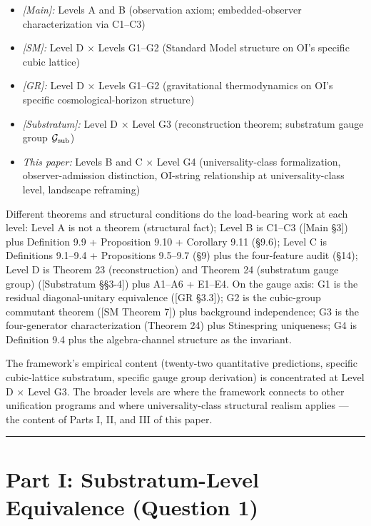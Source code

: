 \documentclass[
]{article}
\providecommand{\tightlist}{%
  \setlength{\itemsep}{0pt}\setlength{\parskip}{0pt}}
\begin{document}
\begin{itemize}
\tightlist
\item
  \emph{{[}Main{]}:} Levels A and B (observation axiom;
  embedded-observer characterization via C1--C3)
\item
  \emph{{[}SM{]}:} Level D × Levels G1--G2 (Standard Model structure on
  OI's specific cubic lattice)
\item
  \emph{{[}GR{]}:} Level D × Levels G1--G2 (gravitational thermodynamics
  on OI's specific cosmological-horizon structure)
\item
  \emph{{[}Substratum{]}:} Level D × Level G3 (reconstruction theorem;
  substratum gauge group \(\mathcal{G}_{\rm sub}\))
\item
  \emph{This paper:} Levels B and C × Level G4 (universality-class
  formalization, observer-admission distinction, OI-string relationship
  at universality-class level, landscape reframing)
\end{itemize}

Different theorems and structural conditions do the load-bearing work at
each level: Level A is not a theorem (structural fact); Level B is
C1--C3 ({[}Main §3{]}) plus Definition 9.9 + Proposition 9.10 +
Corollary 9.11 (§9.6); Level C is Definitions 9.1--9.4 + Propositions
9.5--9.7 (§9) plus the four-feature audit (§14); Level D is Theorem 23
(reconstruction) and Theorem 24 (substratum gauge group) ({[}Substratum
§§3-4{]}) plus A1--A6 + E1--E4. On the gauge axis: G1 is the residual
diagonal-unitary equivalence ({[}GR §3.3{]}); G2 is the cubic-group
commutant theorem ({[}SM Theorem 7{]}) plus background independence; G3
is the four-generator characterization (Theorem 24) plus Stinespring
uniqueness; G4 is Definition 9.4 plus the algebra-channel structure as
the invariant.

The framework's empirical content (twenty-two quantitative predictions,
specific cubic-lattice substratum, specific gauge group derivation) is
concentrated at Level D × Level G3. The broader levels are where the
framework connects to other unification programs and where
universality-class structural realism applies --- the content of Parts
I, II, and III of this paper.

\begin{center}\rule{0.5\linewidth}{0.5pt}\end{center}

\hypertarget{part-i-substratum-level-equivalence-question-1}{%
\section{Part I: Substratum-Level Equivalence (Question
1)}\label{part-i-substratum-level-equivalence-question-1}}
\end{document}
